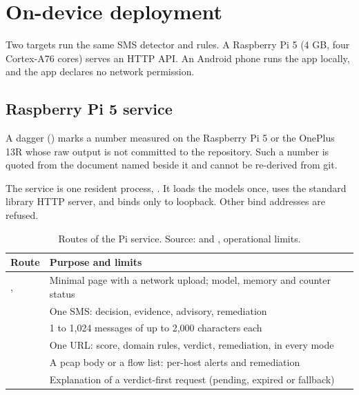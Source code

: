\section{On-device deployment}\label{sec:deployment}

Two targets run the same SMS detector and rules. A Raspberry Pi 5 (4 GB, four Cortex-A76 cores) serves an HTTP API. An Android phone runs the app locally, and the app declares no network permission.

\subsection{Raspberry Pi 5 service}

A dagger (\prose) marks a number measured on the Raspberry Pi 5 or the OnePlus 13R whose raw output is not committed to the repository. Such a number is quoted from the document named beside it and cannot be re-derived from git.

The service is one resident process, . It loads the models once, uses the standard library HTTP server, and binds only to loopback. Other bind addresses are refused.

\begin{table}[t]
\centering
\caption{Routes of the Pi service. Source:  and , operational limits.}\label{tab:routes}
\footnotesize
\setlength{\tabcolsep}{3pt}
\begin{tabularx}{\linewidth}{>{\raggedright\arraybackslash}p{4.2cm}Y}
\toprule
Route & Purpose and limits \\
\midrule
{},  & Minimal page with a network upload; model, memory and counter status \\
 & One SMS: decision, evidence, advisory, remediation \\
 & 1 to 1,024 messages of up to 2,000 characters each \\
 & One URL: score, domain rules, verdict, remediation, in every mode \\
 & A pcap body or a flow list: per-host alerts and remediation \\
 & Explanation of a verdict-first request (pending, expired or fallback) \\
\bottomrule
\end{tabularx}
\end{table}

